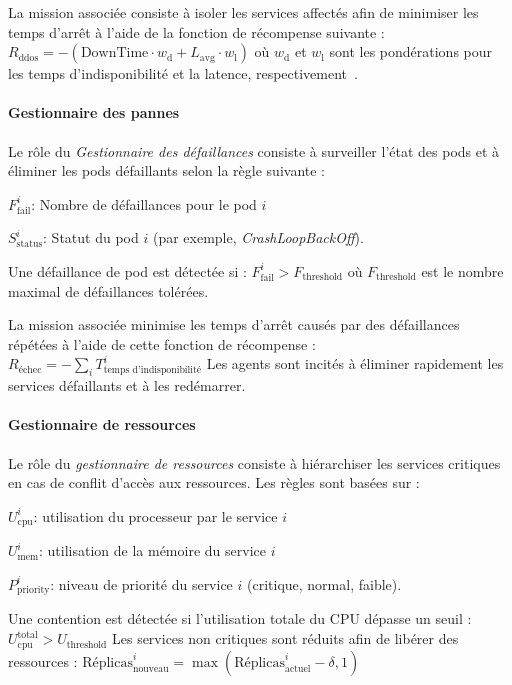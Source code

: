 La mission associée consiste à isoler les services affectés afin de minimiser les temps d'arrêt à l'aide de la fonction de récompense suivante :
$R_{\text{ddos}} = - \left( \text{DownTime} \cdot w_{\text{d}} + L_{\text{avg}} \cdot w_{\text{l}} \right)$
où \( w_{\text{d}} \) et \( w_{\text{l}} \) sont les pondérations pour les temps d'indisponibilité et la latence, respectivement~\cite{Liu2018}.

\noindent \paragraph{\textbf{Gestionnaire des pannes}}

Le rôle du \textit{Gestionnaire des défaillances} consiste à surveiller l'état des pods et à éliminer les pods défaillants selon la règle suivante :
\begin{enumerate*}[label={}, itemjoin={;\quad }]
    \item \( F_{\text{fail}}^i \): Nombre de défaillances pour le pod \( i \)
    \item \( S_{\text{status}}^i \): Statut du pod \( i \) (par exemple, \textit{CrashLoopBackOff}).
\end{enumerate*}
Une défaillance de pod est détectée si :
$F_{\text{fail}}^i > F_{\text{threshold}}$
où \( F_{\text{threshold}} \) est le nombre maximal de défaillances tolérées.

La mission associée minimise les temps d'arrêt causés par des défaillances répétées à l'aide de cette fonction de récompense :
$R_{\text{échec}} = - \sum_{i} T_{\text{temps d'indisponibilité}}^i$
Les agents sont incités à éliminer rapidement les services défaillants et à les redémarrer.

\noindent \paragraph{\textbf{Gestionnaire de ressources}}

Le rôle du \textit{gestionnaire de ressources} consiste à hiérarchiser les services critiques en cas de conflit d'accès aux ressources. Les règles sont basées sur :
\begin{enumerate*}[label={}, itemjoin={;\quad }]
    \item \( U_{\text{cpu}}^i \): utilisation du processeur par le service \( i \)
    \item \( U_{\text{mem}}^i \): utilisation de la mémoire du service \( i \)
    \item \( P_{\text{priority}}^i \): niveau de priorité du service \( i \) (critique, normal, faible).
\end{enumerate*}
Une contention est détectée si l'utilisation totale du CPU dépasse un seuil :
$U_{\text{cpu}}^{\text{total}} > U_{\text{threshold}}$
Les services non critiques sont réduits afin de libérer des ressources :
$\text{Réplicas}_{\text{nouveau}}^i = \max\left( \text{Réplicas}_{\text{actuel}}^i - \delta, 1 \right)$

